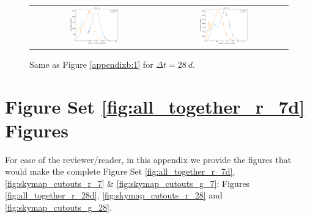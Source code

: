 \documentclass[preprintm,linenumbers]{aastex631}
\begin{document}
\begin{figure}
\begin{tabular}{c c}
				 \includegraphics[width=0.4\textwidth]{results/histograms/hist_first_year_one_snap_v4_0_10yrs_db_noDD_noTwi_CountMetric_doAllTemplateMetrics_reduceCount_z_28_noDD_noTwi.pdf} &
				\includegraphics[width=0.4\textwidth]{results/histograms/hist_first_year_one_snap_v4_0_10yrs_db_noDD_noTwi_CountMetric_doAllTemplateMetrics_reduceCount_y_28_noDD_noTwi.pdf} \\
    			
			\end{tabular}
			\caption{ Same as Figure \ref{appendixb:1} for $\Delta t = 28\ \si{d}$. \label{appendixb:4}}
		\end{figure}

  \section{Figure Set \ref{fig:all_together_r_7d} Figures}

    For ease of the reviewer/reader, in this appendix we provide the figures that would make the complete Figure Set \ref{fig:all_together_r_7d}, \ref{fig:skymap_cutouts_r_7} \& \ref{fig:skymap_cutouts_g_7}: Figures \ref{fig:all_together_r_28d}, \ref{fig:skymap_cutouts_r_28} and \ref{fig:skymap_cutouts_g_28}.
    
\end{document}
